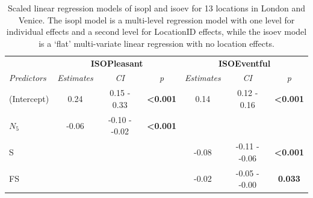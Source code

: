    \begin{table}[h!]
  \centering
\caption{Scaled linear regression models of \gls{isopl} and \gls{isoev} for 13 locations in London and Venice. The \gls{isopl} model is a multi-level regression model with one level for individual effects and a second level for LocationID effects, while the \gls{isoev} model is a `flat' multi-variate linear regression with no location effects. \label{tab:scaled-model}}

  \def\arraystretch{.5}
  \begin{tabular}{@{}l|lccccc@{}}
    \toprule
    \multicolumn{1}{l|}{}                    &
    \multicolumn{3}{c}{\textbf{ISOPleasant}} &
    \multicolumn{3}{c}{\textbf{ISOEventful}}                                                                                                                                                           \\
    \textit{Predictors}                      &
    \multicolumn{1}{c}{\textit{Estimates}}   &
    \textit{CI}                              &
    \textit{p}                               &
    \textit{Estimates}                       &
    \textit{CI}                              &
    \textit{p}                                                                                                                                                                                         \\ \midrule
    (Intercept)                              &
    \multicolumn{1}{c}{0.24}                 &
    0.15 - 0.33                              &
    \textbf{\textless{}0.001}                &
    0.14                                     &
    0.12 - 0.16                              &
    \textbf{\textless{}0.001}                                                                                                                                                                          \\
    $N_5$                                    & \multicolumn{1}{c}{-0.06}                               & -0.10 - -0.02 & \textbf{\textless{}0.001} &       &               &                           \\
    S                                        & \multicolumn{1}{c}{}                                    &               &                           & -0.08 & -0.11 - -0.06 & \textbf{\textless{}0.001} \\
    FS                                       & \multicolumn{1}{c}{}                                    &               &                           & -0.02 & -0.05 - -0.00 & \textbf{0.033}            \\

\end{tabular}
\end{table}
